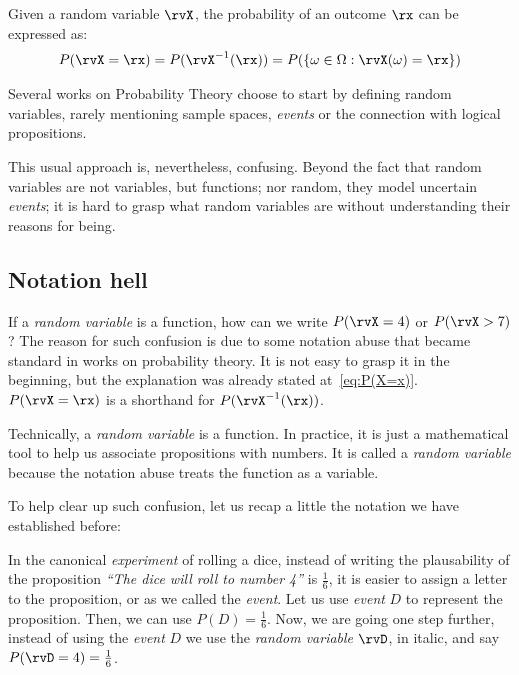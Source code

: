 Given a random variable \(\rvX\), the probability of an outcome \(\rx\) can be expressed as:
\begin{align}
	P(\rvX=\rx) = P(\rvX^{-1}(\rx)) = P(\{\omega \in \Omega: \rvX(\omega)=\rx\})\label{eq:P(X=x)} \end{align}

Several works on Probability Theory choose to start by defining random variables, rarely mentioning sample spaces, \emph{events} or the connection with logical propositions.

This usual approach is, nevertheless, confusing. Beyond the fact that random variables are not variables, but functions; nor random, they model uncertain \emph{events}; it is hard to grasp what random variables are without understanding their reasons for being.

%

\subsection{Notation hell} If a \emph{random variable} is a function, how can we write \(P(\rvX=4)\) or \(P(\rvX > 7)\)? The reason for such confusion is due to some notation abuse that became standard in works on probability theory. It is not easy to grasp it in the beginning, but the explanation was already stated at~\eqref{eq:P(X=x)}. \(P(\rvX=\rx)\) is a shorthand for \(P(\rvX^{-1}(\rx))\).

Technically, a \emph{random variable} is a function.  In practice, it is just a mathematical tool to help us associate propositions with numbers. It is called a \emph{random variable} because the notation abuse treats the function as a variable.

To help clear up such confusion, let us recap a little the notation we have established before:

In the canonical \emph{experiment} of rolling a dice, instead of writing the plausability of the proposition \emph{``The dice will roll to number 4''} is \(\frac{1}{6}\), it is easier to assign a letter to the proposition, or as we called the \emph{event}. Let us use \emph{event} \(D\) to represent the proposition. Then, we can use \(P(D)=\frac{1}{6}\). Now, we are going one step further, instead of using the \emph{event} \(D\) we use the \emph{random variable} \(\rvD\), in italic, and say \(P(\rvD=4)=\frac{1}{6}\).

